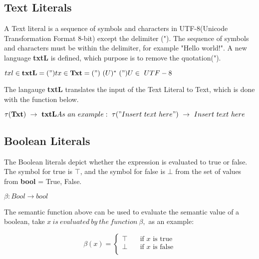   
  \subsection{Text Literals}
  A Text literal is a sequence of symbols and characters in UTF-8(Unicode Transformation Format 8-bit) except the delimiter ("). The sequence of symbols and characters must be within the delimiter, for example "Hello world!". A new language \textbf{txtL} is defined, which purpose is to remove the quotation("). 
  
  \begin{math}
  txl \in \textbf{txtL} = (") \newline
  tx \in \textbf{Txt} = (") \ (U)^* \ (")\ \newline
  U \in \ {UTF-8}
  \end{math}
  
  The langauge \textbf{txtL} translates the input of the Text Literal to Text, which is done with the function below. 
  
  \begin{math}
  	\tau(\textbf{Txt}) \ \rightarrow \ \textbf{txtL} \newline
  	As \ an \ example: \ \tau("Insert \ text \ here") \ \rightarrow \ Insert \ text \ here
  \end{math}
  
  \subsection{Boolean Literals}
  The Boolean literals depict whether the expression is evaluated to true or false. The symbol for true is \begin{math} \top \end{math}, and the symbol for false is \begin{math} \bot \end{math} from the set of values from \textbf{bool} = {True, False}.
  
  \begin{math}
  	\beta : Bool \rightarrow bool
  \end{math}
  
  The semantic function above can be used to evaluate the semantic value of a boolean, take \begin{math} x \ is \ evaluated \ by \ the \ function \ \beta,  \end{math} as an example:
  
  \[ \beta(x) =
    \begin{cases}
      \top       & \quad \text{if } x \text{ is true}\\
      \bot  & \quad \text{if } x \text{ is false}\\
    \end{cases}
  \]
  
